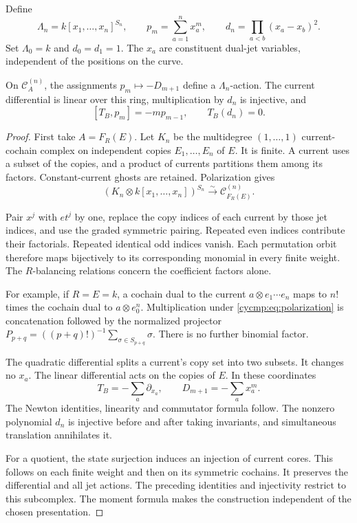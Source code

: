 Define
\begin{equation}\label{cycmp:eq:discriminant}
 \Lambda_n=k[x_1,\ldots,x_n]^{S_n},\qquad
 p_m=\sum_{a=1}^n x_a^m,
 \qquad d_n=\prod_{a<b}(x_a-x_b)^2.
\end{equation}
Set $\Lambda_0=k$ and $d_0=d_1=1$. The $x_a$ are constituent
dual-jet variables, independent of the positions on the curve.

\begin{lemma}\label{cycmp:lem:polarization}
On $\mathcal C_A^{(n)}$, the assignments $p_m\mapsto-D_{m+1}$
define a $\Lambda_n$-action. The current differential is linear
over this ring, multiplication by $d_n$ is injective, and
\[
 [T_B,p_m]=-mp_{m-1},\qquad T_B(d_n)=0.
\]
\end{lemma}

\begin{proof}
First take $A=F_R(E)$. Let $K_n$ be the multidegree
$(1,\ldots,1)$ current-cochain complex on independent copies
$E_1,\ldots,E_n$ of $E$. It is finite. A current uses a subset
of the copies, and a product of currents partitions them among its
factors. Constant-current ghosts are retained. Polarization gives
\begin{equation}\label{cycmp:eq:polarization}
 (K_n\otimes k[x_1,\ldots,x_n])^{S_n}
       \xrightarrow{\sim}\mathcal C_{F_R(E)}^{(n)}.
\end{equation}

Pair $x^j$ with $et^j$ by one, replace the copy indices of each
current by those jet indices, and use the graded symmetric pairing.
Repeated even indices contribute their factorials. Repeated identical
odd indices vanish. Each permutation orbit therefore maps bijectively
to its corresponding monomial in every finite weight. The
$R$-balancing relations concern the coefficient factors alone.

For example, if $R=E=k$, a cochain dual to the current
$a\otimes e_1\cdots e_n$ maps to $n!$ times the cochain dual to
$a\otimes e_0^n$. Multiplication under
\eqref{cycmp:eq:polarization} is concatenation followed by the
normalized projector
$P_{p+q}=((p+q)!)^{-1}\sum_{\sigma\in S_{p+q}}\sigma$.
There is no further binomial factor.

The quadratic differential splits a current's copy set into two
subsets. It changes no $x_a$. The linear differential acts on the
copies of $E$. In these coordinates
\[
 T_B=-\sum_a\partial_{x_a},\qquad
 D_{m+1}=-\sum_a x_a^m.
\]
The Newton identities, linearity and commutator formula follow.
The nonzero polynomial $d_n$ is injective before and after taking
invariants, and simultaneous translation annihilates it.

For a quotient, the state surjection induces an injection of current
cores. This follows on each finite weight and then on its symmetric
cochains. It preserves the differential and all jet
actions. The preceding identities and injectivity restrict to this
subcomplex. The moment formula makes the construction independent
of the chosen presentation.
\end{proof}

